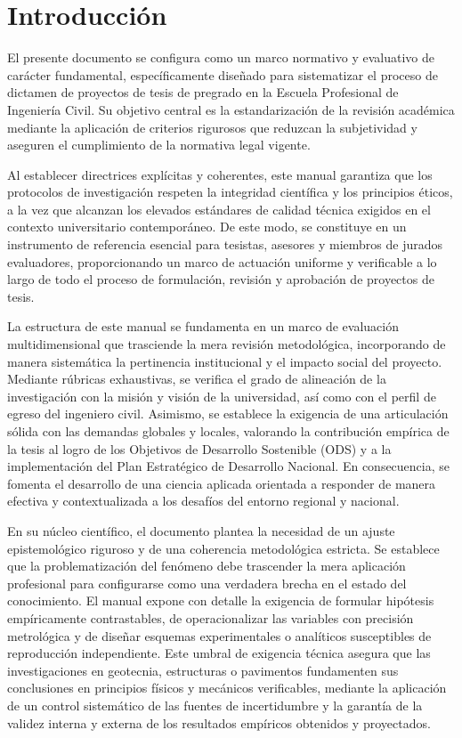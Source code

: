 



\section*{Introducción}

El presente documento se configura como un marco normativo y evaluativo de carácter fundamental, específicamente diseñado para sistematizar el proceso de dictamen de proyectos de tesis de pregrado en la Escuela Profesional de Ingeniería Civil. Su objetivo central es la estandarización de la revisión académica mediante la aplicación de criterios rigurosos que reduzcan la subjetividad y aseguren el cumplimiento de la normativa legal vigente.  

Al establecer directrices explícitas y coherentes, este manual garantiza que los protocolos de investigación respeten la integridad científica y los principios éticos, a la vez que alcanzan los elevados estándares de calidad técnica exigidos en el contexto universitario contemporáneo. De este modo, se constituye en un instrumento de referencia esencial para tesistas, asesores y miembros de jurados evaluadores, proporcionando un marco de actuación uniforme y verificable a lo largo de todo el proceso de formulación, revisión y aprobación de proyectos de tesis.

La estructura de este manual se fundamenta en un marco de evaluación multidimensional que trasciende la mera revisión metodológica, incorporando de manera sistemática la pertinencia institucional y el impacto social del proyecto. Mediante rúbricas exhaustivas, se verifica el grado de alineación de la investigación con la misión y visión de la universidad, así como con el perfil de egreso del ingeniero civil. Asimismo, se establece la exigencia de una articulación sólida con las demandas globales y locales, valorando la contribución empírica de la tesis al logro de los Objetivos de Desarrollo Sostenible (ODS) y a la implementación del Plan Estratégico de Desarrollo Nacional. En consecuencia, se fomenta el desarrollo de una ciencia aplicada orientada a responder de manera efectiva y contextualizada a los desafíos del entorno regional y nacional.

En su núcleo científico, el documento plantea la necesidad de un ajuste epistemológico riguroso y de una coherencia metodológica estricta. Se establece que la problematización del fenómeno debe trascender la mera aplicación profesional para configurarse como una verdadera brecha en el estado del conocimiento. El manual expone con detalle la exigencia de formular hipótesis empíricamente contrastables, de operacionalizar las variables con precisión metrológica y de diseñar esquemas experimentales o analíticos susceptibles de reproducción independiente. Este umbral de exigencia técnica asegura que las investigaciones en geotecnia, estructuras o pavimentos fundamenten sus conclusiones en principios físicos y mecánicos verificables, mediante la aplicación de un control sistemático de las fuentes de incertidumbre y la garantía de la validez interna y externa de los resultados empíricos obtenidos y proyectados.

